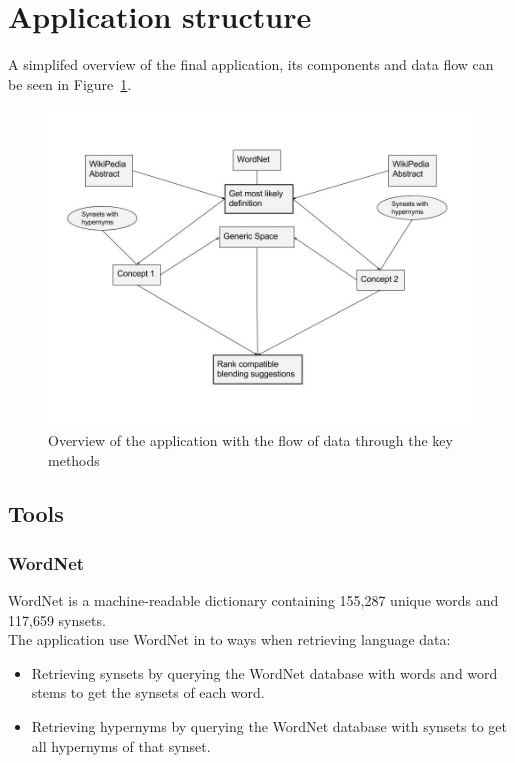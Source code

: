 


\section{Application structure}
A simplifed overview of the final application, its components and data flow can be seen in Figure~\ref{fig:application-structure}.

\begin{figure}
\centering
\includegraphics[width=1\linewidth]{"Figures/Application structure"}
\caption{Overview of the application with the flow of data through the key methods}
\label{fig:application-structure}
\end{figure}

\subsection{Tools}

\subsubsection{WordNet}
WordNet is a machine-readable dictionary containing 155,287 unique words and 117,659 synsets. \parencite{fellbaum1998wordnet} \parencite{wordnetstatistics}
\\The application use WordNet in to ways when retrieving language data:
\begin{itemize}
	\item Retrieving synsets by querying the WordNet database with words and word stems to get the synsets of each word.
	\item Retrieving hypernyms by querying the WordNet database with synsets to get all hypernyms of that synset.
\end{itemize}


